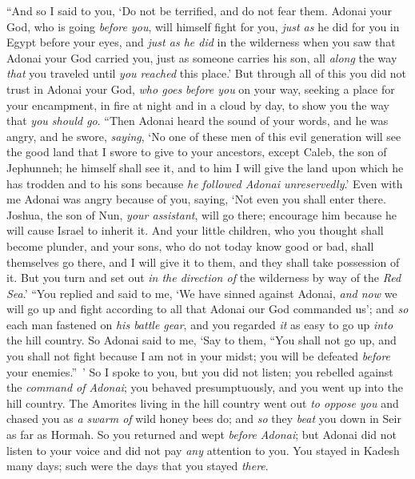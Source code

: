 \begin{biblechapter}
\verse “And so I said to you, ‘Do not be terrified, and do not fear them.
\verse Adonai your God, who is going \textit{before you}, will himself fight for you, \textit{just as} he did for you in Egypt before your eyes,
\verse and \textit{just as he did} in the wilderness when you saw that Adonai your God carried you, just as someone carries his son, all \textit{along} the way \textit{that} you traveled until \textit{you reached} this place.’
\verse But through all of this you did not trust in Adonai your God,
\verse \textit{who goes} \textit{before you} on your way, seeking a place for your encampment, in fire at night and in a cloud by day, to show you the way that \textit{you should go}.
\verse “Then Adonai heard the sound of your words, and he was angry, and he swore, \textit{saying},
\verse ‘No one of these men of this evil generation will see the good land that I swore to give to your ancestors,
\verse except Caleb, the son of Jephunneh; he himself shall see it, and to him I will give the land upon which he has trodden and to his sons because \textit{he followed Adonai unreservedly}.’
\verse Even with me Adonai was angry because of you, saying, ‘Not even you shall enter there.
\verse Joshua, the son of Nun, \textit{your assistant}, will go there; encourage him because he will cause Israel to inherit it.
\verse And your little children, who you thought shall become plunder, and your sons, who do not today know good or bad, shall themselves go there, and I will give it to them, and they shall take possession of it.
\verse But you turn and set out \textit{in the direction of} the wilderness by way of the \textit{Red Sea}.’
\verse “You replied and said to me, ‘We have sinned against Adonai, \textit{and now} we will go up and fight according to all that Adonai our God commanded us’; and \textit{so} each man fastened on \textit{his battle gear}, and you regarded \textit{it} as easy to go up \textit{into} the hill country.
\verse So Adonai said to me, ‘Say to them, “You shall not go up, and you shall not fight because I am not in your midst; you will be defeated \textit{before} your enemies.” ’
\verse So I spoke to you, but you did not listen; you rebelled against the \textit{command of Adonai}; you behaved presumptuously, and you went up into the hill country.
\verse The Amorites living in the hill country went out \textit{to oppose you} and chased you as \textit{a swarm of} wild honey bees do; and \textit{so} they \textit{beat} you down in Seir as far as Hormah.
\verse So you returned and wept \textit{before Adonai}; but Adonai did not listen to your voice and did not pay \textit{any} attention to you.
\verse You stayed in Kadesh many days; such were the days that you stayed \textit{there}.
\end{biblechapter}

